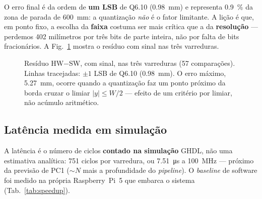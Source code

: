 \documentclass[conference]{IEEEtran}
\begin{document}
O erro final \'e da ordem de \textbf{um LSB} de Q6.10 (\SI{0.98}{\milli\metre}) e
representa \SI{0.9}{\percent} da zona de parada de \SI{600}{\milli\metre}: a
quantiza\c{c}\~ao \emph{n\~ao} \'e o fator limitante. A li\c{c}\~ao \'e que, em
ponto fixo, a escolha da \textbf{faixa} costuma ser mais cr\'itica que a da
\textbf{resolu\c{c}\~ao} --- perdemos \num{402} milímetros por tr\^es bits de
parte inteira, n\~ao por falta de bits fracion\'arios. A Fig.~\ref{fig:erro}
mostra o res\'iduo com sinal nas tr\^es varreduras.

\begin{figure}[!t]
\centering
{}
\caption{Res\'iduo HW$-$SW, com sinal, nas tr\^es varreduras (\num{57}
compara\c{c}\~oes). Linhas tracejadas: $\pm1$ LSB de Q6.10
(\SI{0.98}{\milli\metre}). O erro m\'aximo, \SI{5.27}{\milli\metre}, ocorre quando
a quantiza\c{c}\~ao faz um ponto pr\'oximo da borda cruzar o limiar
$|y|\le W/2$ --- efeito de um crit\'erio por limiar, n\~ao ac\'umulo aritm\'etico.}
\label{fig:erro}
\end{figure}

\subsection{Lat\^encia medida em simula\c{c}\~ao}
A lat\^encia \'e o n\'umero de ciclos \textbf{contado na simula\c{c}\~ao} GHDL,
n\~ao uma estimativa anal\'itica: \num{751} ciclos por varredura, ou
\SI{7.51}{\micro\second} a \SI{100}{\mega\hertz} --- pr\'oximo da previs\~ao de
PC1 ($\sim N$ mais a profundidade do \emph{pipeline}). O \emph{baseline} de
software foi medido na pr\'opria Raspberry~Pi~5 que embarca o sistema
(Tab.~\ref{tab:speedup}).
\end{document}
